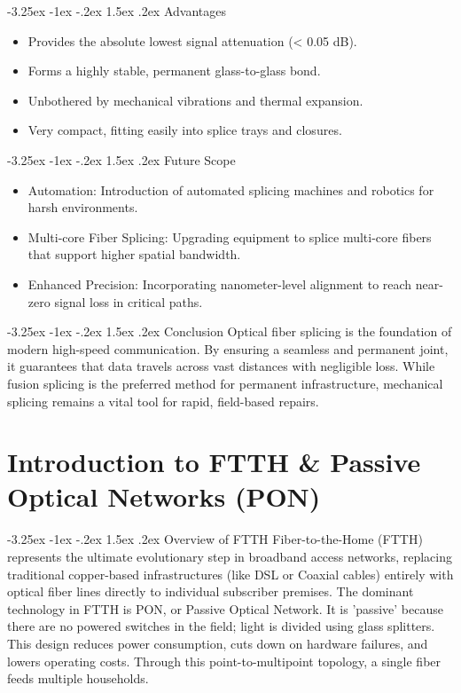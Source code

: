 \documentclass[11pt,a4paper]{report}
\makeatletter
\renewcommand{\section}{\@startsection{section}{1}{\z@}%
  {-3.25ex \@plus -1ex \@minus -.2ex}%
  {1.5ex \@plus.2ex}%
  {\normalfont\Large\bfseries\color{primaryColor}}}
\makeatother
\begin{document}
\section{Advantages}
\begin{itemize}
  \item Provides the absolute lowest signal attenuation (< 0.05 dB).
  \item Forms a highly stable, permanent glass-to-glass bond.
  \item Unbothered by mechanical vibrations and thermal expansion.
  \item Very compact, fitting easily into splice trays and closures.
\end{itemize}
\section{Future Scope}
\begin{itemize}
  \item Automation: Introduction of automated splicing machines and robotics for harsh environments.
  \item Multi-core Fiber Splicing: Upgrading equipment to splice multi-core fibers that support higher spatial bandwidth.
  \item Enhanced Precision: Incorporating nanometer-level alignment to reach near-zero signal loss in critical paths.
\end{itemize}
\section{Conclusion}
Optical fiber splicing is the foundation of modern high-speed communication. By ensuring a seamless and permanent joint, it guarantees that data travels across vast distances with negligible loss. While fusion splicing is the preferred method for permanent infrastructure, mechanical splicing remains a vital tool for rapid, field-based repairs.
\chapter{Introduction to FTTH \& Passive Optical Networks (PON)}
\section{Overview of FTTH}
Fiber-to-the-Home (FTTH) represents the ultimate evolutionary step in broadband access networks, replacing traditional copper-based infrastructures (like DSL or Coaxial cables) entirely with optical fiber lines directly to individual subscriber premises. The dominant technology in FTTH is PON, or Passive Optical Network. It is 'passive' because there are no powered switches in the field; light is divided using glass splitters. This design reduces power consumption, cuts down on hardware failures, and lowers operating costs. Through this point-to-multipoint topology, a single fiber feeds multiple households.
\end{document}
